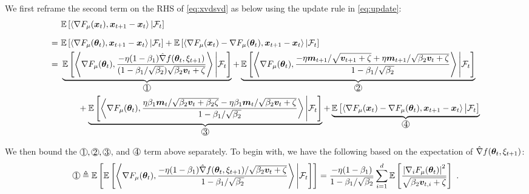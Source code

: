 \begin{appendices}
We first reframe the second term on the RHS of \eqref{eq:xvdsvd} as below using the update rule in \eqref{eq:update}:
\begin{equation}
\begin{aligned}
&\E\left[\left\langle\nabla F_{\mu}(\vx_t), \vx_{t+1} - \vx_{t}\right\rangle | \gF_t\right] \\[7pt]
=\,\,& \E\left[\left\langle\nabla F_{\mu}(\vtheta_t), \vx_{t+1} - \vx_{t}\right\rangle | \gF_t\right] + \E\left[\left\langle\nabla F_{\mu}(\vx_t) - \nabla F_{\mu}(\vtheta_t), \vx_{t+1} - \vx_{t}\right\rangle | \gF_t \right] \\
=\,\,& \underbrace{\E\left[\left\langle\nabla F_{\mu}(\vtheta_t), \frac{- \eta(1-\beta_1)\hat{\nabla}f(\vtheta_t, \xi_{t+1})}{(1 - \beta_1/\sqrt{\beta_2})\sqrt{\beta_2\vv_{t} + \zeta}}\right\rangle \Bigg| \gF_t\right]}_{\circled{1}} + \underbrace{\E\left[\left\langle \nabla F_{\mu}(\vtheta_t), \frac{-\eta\vm_{t+1}/\sqrt{\vv_{t+1} + \zeta} + \eta\vm_{t+1} / \sqrt{\beta_2\vv_{t} + \zeta}}{1-\beta_1/\sqrt{\beta_2}}\right\rangle \Bigg| \gF_t \right]}_{\circled{2}} \\
&\qquad + \underbrace{\E\left[\left\langle \nabla F_{\mu}(\vtheta_t), \frac{\eta\beta_1\vm_{t}/\sqrt{\beta_2\vv_{t} + \beta_2\zeta} - \eta\beta_1\vm_t / \sqrt{\beta_2\vv_{t} + \zeta}}{1-\beta_1/\sqrt{\beta_2}}\right\rangle \Bigg| \gF_t \right]}_{\circled{3}} + \underbrace{\E\left[\left\langle\nabla F_{\mu}(\vx_t) - \nabla F_{\mu}(\vtheta_t), \vx_{t+1} - \vx_{t}\right\rangle \big| \gF_t \right]}_{\circled{4}}
\end{aligned}
\end{equation}

We then bound the $\circled{1}, \circled{2}, \circled{3}$, and $\circled{4}$ term above separately. To begin with, we have the following based on the expectation of $\hat{\nabla}f({\bm{\theta}}_t, \xi_{t+1})$:
\begin{equation}
\circled{1} \triangleq \E\left[\E\left[\left\langle\nabla F_{\mu}(\vtheta_t), \frac{- \eta(1-\beta_1)\hat{\nabla}f(\vtheta_t, \xi_{t+1})/\sqrt{\beta_2\vv_{t} + \zeta}}{1 - \beta_1/\sqrt{\beta_2}}\right\rangle \Bigg| \gF_t\right]\right] = \frac{- \eta(1 - \beta_1)}{1 - \beta_1/\sqrt{\beta_2}}\sum_{i=1}^d\E\left[\frac{\left|\nabla_i F_{\mu}(\vtheta_t)\right|^2}{\sqrt{\beta_2\vv_{t,i} + \zeta}}\right] \ . \label{eq:cir-1}
\end{equation}


\end{appendices}
